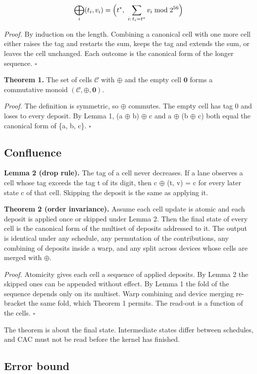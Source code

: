 \documentclass[journal]{IEEEtran}
\providecommand{\mdlgwhtsquare}{\ensuremath{\square}}
\begin{document}
\[\bigoplus_i (t_i,v_i)=\Bigl(t^*,\ \sum_{i:\,t_i=t^*} v_i \bmod 2^{56}\Bigr)\]

\emph{Proof.} By induction on the length. Combining a canonical cell
with one more cell either raises the tag and restarts the sum, keeps the
tag and extends the sum, or leaves the cell unchanged. Each outcome is
the canonical form of the longer sequence. \hfill$\mdlgwhtsquare$

\textbf{Theorem 1.} The set of cells \(\mathcal{C}\) with \(\oplus\) and
the empty cell \(\mathbf{0}\) forms a commutative monoid
\((\mathcal{C},\oplus,\mathbf{0})\).

\emph{Proof.} The definition is symmetric, so $\oplus$ commutes. The empty cell
has tag 0 and loses to every deposit. By Lemma 1, (a $\oplus$ b) $\oplus$ c and a $\oplus$ (b
$\oplus$ c) both equal the canonical form of \{a, b, c\}. \hfill$\mdlgwhtsquare$

\hypertarget{confluence}{%
\subsection{Confluence}\label{confluence}}

\textbf{Lemma 2 (drop rule).} The tag of a cell never decreases. If a
lane observes a cell whose tag exceeds the tag t of its digit, then c $\oplus$
(t, v) = c for every later state c of that cell. Skipping the deposit is
the same as applying it.

\textbf{Theorem 2 (order invariance).} Assume each cell update is atomic
and each deposit is applied once or skipped under Lemma 2. Then the
final state of every cell is the canonical form of the multiset of
deposits addressed to it. The output is identical under any schedule,
any permutation of the contributions, any combining of deposits inside a
warp, and any split across devices whose cells are merged with $\oplus$.

\emph{Proof.} Atomicity gives each cell a sequence of applied deposits.
By Lemma 2 the skipped ones can be appended without effect. By Lemma 1
the fold of the sequence depends only on its multiset. Warp combining
and device merging re-bracket the same fold, which Theorem 1 permits.
The read-out is a function of the cells. \hfill$\mdlgwhtsquare$

The theorem is about the final state. Intermediate states differ between
schedules, and CAC must not be read before the kernel has finished.

\hypertarget{error-bound}{%
\subsection{Error bound}\label{error-bound}}
\end{document}
